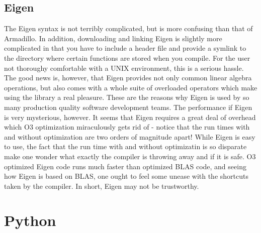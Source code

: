 \subsection{Eigen}
The Eigen syntax is not terribly complicated, but is more confusing than that of Armadillo. In addition, downloading and linking Eigen is slightly more complicated in that you have to include a header file and provide a symlink to the directory where certain functions are stored when you compile. For the user not thoroughy comfortable with a UNIX environment, this is a serious hassle. The good news is, however, that Eigen provides not only common linear algebra operations, but also comes with a whole suite of overloaded operators which make using the library a real pleasure. These are the reasons why Eigen is used by so many production quality software development teams. 
The performance if Eigen is very mysterious, however. It seems that Eigen requires a great deal of overhead which O3 optimization miraculously gets rid of - notice that the run times with and without optimization are two orders of magnitude apart! While Eigen is easy to use, the fact that the run time with and without optimizatin is so disparate make one wonder what exactly the compiler is throwing away and if it is safe. O3 optimized Eigen code runs much faster than optimized BLAS code, and seeing how Eigen is based on BLAS, one ought to feel some unease with the shortcuts taken by the compiler. In short, Eigen may not be trustworthy.
 
\section{Python}
